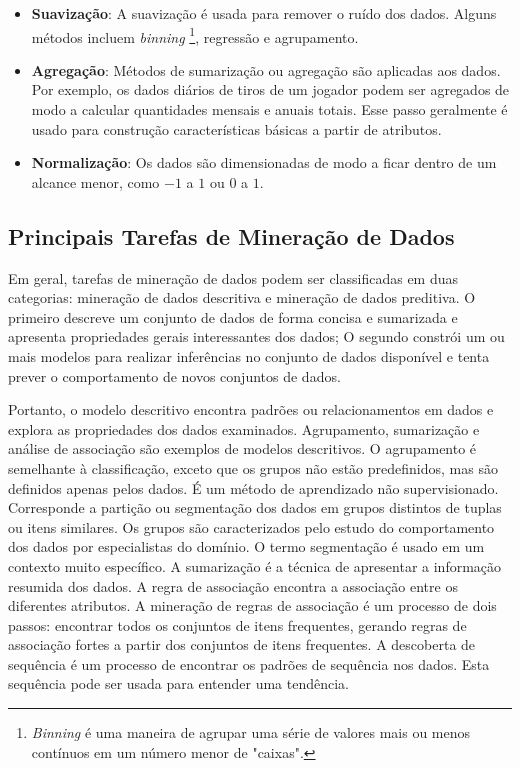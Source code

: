 \begin{itemize}
  \item 
  \textbf{Suavização}: A suavização é usada para remover o ruído dos dados. Alguns métodos incluem \textit{binning} \footnote{\textit{Binning} é uma maneira de agrupar uma série de valores mais ou menos contínuos em um número menor de "caixas".}, regressão e agrupamento.
  \item
\textbf{Agregação}: Métodos de sumarização ou agregação são aplicadas aos dados. Por exemplo, os dados diários de tiros de um jogador podem ser agregados de modo a calcular quantidades mensais e anuais totais. Esse passo geralmente é usado para  construção características básicas a partir de atributos.
  \item 
\textbf{Normalização}: Os dados são dimensionadas de modo a ficar dentro de um alcance menor, como $-1$ a $1$ ou $0$ a $1$.
\end{itemize}

\subsection{Principais Tarefas de Mineração de Dados}
Em geral, tarefas de mineração de dados podem ser classificadas em duas categorias: mineração de dados descritiva e mineração de dados preditiva. O primeiro descreve um conjunto de dados de forma concisa e sumarizada e apresenta propriedades gerais interessantes dos dados; O segundo constrói um ou mais modelos para realizar inferências no conjunto de dados disponível e tenta prever o comportamento de novos conjuntos de dados.

Portanto, o modelo descritivo encontra padrões ou relacionamentos em dados e explora as propriedades dos dados examinados. Agrupamento, sumarização e análise de associação são exemplos de modelos descritivos. O agrupamento é semelhante à classificação, exceto que os grupos não estão predefinidos, mas são definidos apenas pelos dados. É um método de aprendizado não supervisionado. Corresponde a partição ou segmentação dos dados em grupos distintos de tuplas ou itens similares. Os grupos são caracterizados pelo estudo do comportamento dos dados por especialistas do domínio. O termo segmentação é usado em um contexto muito específico. A sumarização é a técnica de apresentar a informação resumida dos dados. A regra de associação encontra a associação entre os diferentes atributos. A mineração de regras de associação é um processo de dois passos: encontrar todos os conjuntos de itens frequentes, gerando regras de associação fortes a partir dos conjuntos de itens frequentes. A descoberta de sequência é um processo de encontrar os padrões de sequência nos dados. Esta sequência pode ser usada para entender uma tendência.

